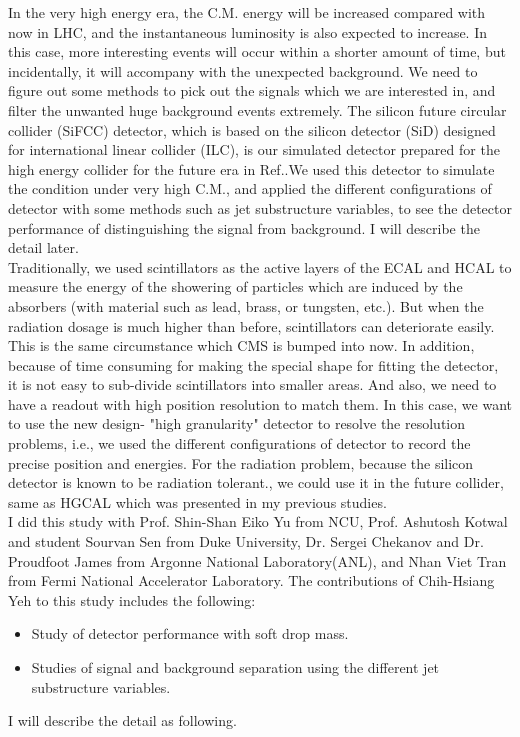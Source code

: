 \documentclass[12pt,twoside,a4paper,an,final]{cms-tdr}
\begin{document}
In the very high energy era, the C.M. energy will be increased compared with now in LHC, and the instantaneous luminosity is also expected to increase. In this case, more interesting events will occur within a shorter amount of time, but incidentally, it will accompany with the unexpected background. We need to figure out some methods to pick out the signals which we are interested in, and filter the unwanted huge background events extremely. The silicon future circular collider (SiFCC) detector, which is based on the silicon detector (SiD)\cite{Aihara:2009ad} designed for international linear collider (ILC)\cite{Adolphsen:2013kya}\cite{Behnke:2013lya}, is our simulated detector prepared for the high energy collider for the future era in Ref.\cite{Chekanov:2016ppq}.We used this detector to simulate the condition under very high C.M., and applied the different configurations of detector with some methods such as jet substructure variables, to see the detector performance of distinguishing the signal from background. I will describe the detail later.\\

Traditionally, we used scintillators as the active layers of the ECAL and HCAL to measure the energy of the showering of particles which are induced by the absorbers (with material such as lead, brass, or tungsten, etc.). But when the radiation dosage is much higher than before, scintillators can deteriorate easily. This is the same circumstance which CMS is bumped into now. In addition, because of time consuming for making the special shape for fitting the detector, it is not easy to sub-divide scintillators into smaller areas. And also, we need to have a readout with high position resolution to match them. In this case, we want to use the new design- "high granularity" detector to resolve the resolution problems, i.e., we used the different configurations of detector to record the precise position and energies. For the radiation problem, because the silicon detector is known to be radiation tolerant.\cite{Li:2002ru}, we could use it in the future collider, same as HGCAL which was presented in my previous studies.\\

I did this study with Prof. Shin-Shan Eiko Yu from NCU, Prof. Ashutosh Kotwal and student Sourvan Sen from Duke University, Dr. Sergei Chekanov and Dr. Proudfoot James from Argonne National Laboratory(ANL), and Nhan Viet Tran from Fermi National Accelerator Laboratory. The contributions of Chih-Hsiang Yeh to this study includes the following:
\begin{itemize}
\item Study of detector performance with soft drop mass.
\item Studies of signal and background separation using the different jet substructure variables.
\end{itemize}
I will describe the detail as following.
\end{document}
